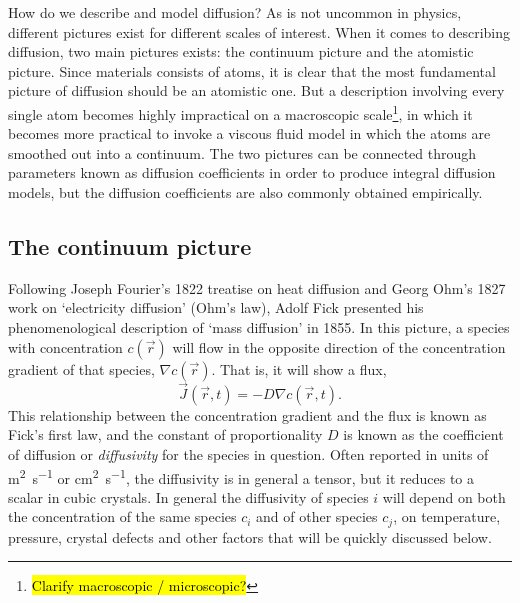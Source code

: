 \documentclass[11pt,bibliography=totoc,index=totoc]{scrbook}   %
\newcommand{\comment}[1]{\hl{#1}}
\begin{document}
How do we describe and model diffusion?
As is not uncommon in physics, different pictures exist for different scales of interest. 
When it comes to describing diffusion, two main pictures exists: the continuum picture and the atomistic picture. 
Since materials consists of atoms, it is clear that the most fundamental picture of diffusion should be an atomistic one.
But a description involving every single atom becomes highly impractical on a macroscopic scale\footnote{\comment{Clarify macroscopic / microscopic?}
}, in which it becomes more practical to invoke a viscous fluid model in which the atoms are smoothed out into a continuum.
The two pictures can be connected through parameters known as diffusion coefficients in order to produce integral diffusion models,
but the diffusion coefficients are also commonly obtained empirically.

%
\subsection{The continuum picture}\label{sec:ContinuumPicture}
%

Following Joseph Fourier's 1822 treatise on heat diffusion\cite{Fourier:1822} and Georg Ohm's 1827 work on `electricity diffusion' (Ohm's law),\cite{Ohm:1827} Adolf Fick presented his phenomenological description of `mass diffusion' in 
1855.\cite{Fick:1855}
In this picture, a species with concentration $c(\vec{r})$ will flow in the opposite direction of the concentration gradient of that species, $\nabla c(\vec{r})$. That is, it will show a flux,
\begin{equation}
  \vec{J}(\vec{r},t) = - D \nabla c(\vec{r},t).
  \label{eq:ficks1st}
\end{equation}
This relationship between the concentration gradient and the flux is known as Fick's first law, and the constant of proportionality $D$ is known as the coefficient of diffusion or \emph{diffusivity} for the species in question. 
Often reported in units of \si{\metre\squared\per\second} or \si{\centi\metre\squared\per\second}, the diffusivity is in general a tensor, but it reduces to a scalar in cubic crystals. 
In general the diffusivity of species $i$ will depend on both the concentration of the same species $c_i$ and of other species $c_j$, on temperature, pressure, crystal defects and other factors that will be quickly discussed below.
\end{document}
